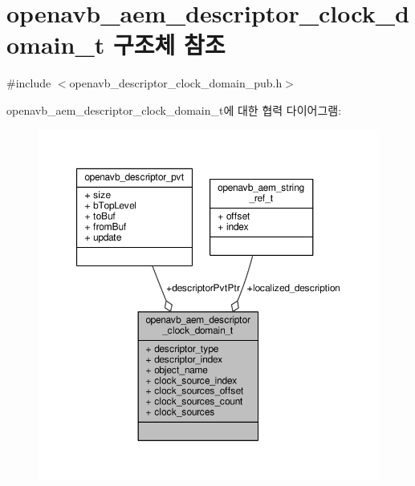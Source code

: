 \hypertarget{structopenavb__aem__descriptor__clock__domain__t}{}\section{openavb\+\_\+aem\+\_\+descriptor\+\_\+clock\+\_\+domain\+\_\+t 구조체 참조}
\label{structopenavb__aem__descriptor__clock__domain__t}


{\ttfamily \#include $<$openavb\+\_\+descriptor\+\_\+clock\+\_\+domain\+\_\+pub.\+h$>$}



openavb\+\_\+aem\+\_\+descriptor\+\_\+clock\+\_\+domain\+\_\+t에 대한 협력 다이어그램\+:
\nopagebreak
\begin{figure}[H]
\begin{center}
\leavevmode
\includegraphics[width=350pt]{structopenavb__aem__descriptor__clock__domain__t__coll__graph}
\end{center}
\end{figure}
